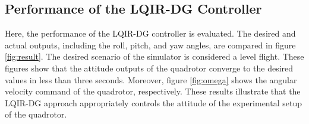 \documentclass[3p,times]{elsarticle}
\newcommand\Tstrut{\rule{0pt}{2.6ex}}         %
\begin{document}


\subsection{Performance of the LQIR-DG Controller}
\noindent Here, the performance of the LQIR-DG controller is evaluated. The desired and actual outputs, including the roll, pitch, and yaw angles, are compared in figure \ref{fig:result}. The desired scenario of the simulator is considered a level flight. These figures show that the attitude outputs of the quadrotor converge to the desired values in less than three seconds. Moreover, figure \ref{fig:omega} shows the angular velocity command of the quadrotor, 
respectively. These results illustrate that the LQIR-DG approach appropriately controls the attitude of the experimental setup of the quadrotor.
\end{document}
